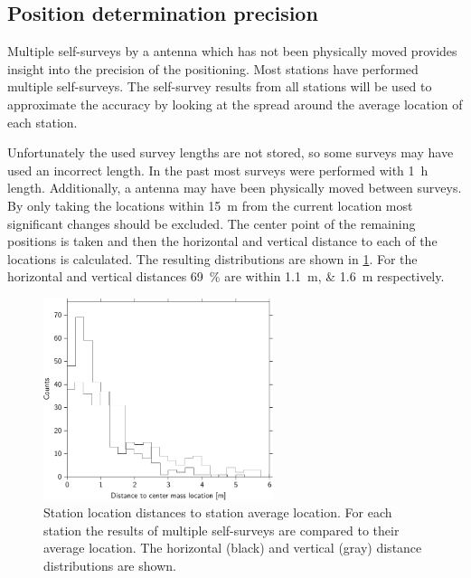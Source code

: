 \subsection{Position determination precision}
\label{subsec:position_determination_precision}

Multiple self-surveys by a \gps antenna which has not been physically moved provides insight into the precision of the positioning. Most \hisparc stations have performed multiple self-surveys. The self-survey results from all \hisparc stations will be used to approximate the \gps accuracy by looking at the spread around the average location of each station.

Unfortunately the used survey lengths are not stored, so some surveys may have used an incorrect length. In the past most surveys were performed with \SI{1}{\hour} length. Additionally, a \gps antenna may have been physically moved between surveys. By only taking the \gps locations within \SI{15}{\meter} from the current location most significant changes should be excluded. The center point of the remaining positions is taken and then the horizontal and vertical distance to each of the locations is calculated. The resulting distributions are shown in \cref{fig:gps_distance_cm_all}. For the horizontal and vertical distances \SI{69}{\percent} are within \SIlist{1.1;1.6}{\meter} respectively.

\begin{figure}
    \centering
    \includegraphics[width=0.6\textwidth]
                    {plots/cluster/gps_distance_cm_all}
    \caption{Station \gps location distances to station average location. For each station the results of multiple self-surveys are compared to their average location. The horizontal (black) and vertical (gray) distance distributions are shown.}
    \label{fig:gps_distance_cm_all}
\end{figure}

